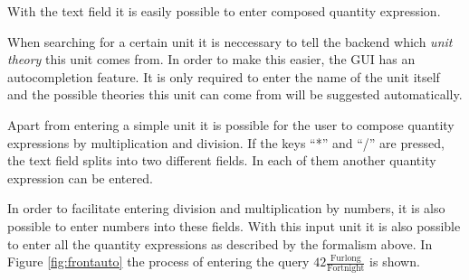 With the text field it is easily possible to enter composed quantity expression.

When searching for a certain unit it is neccessary to tell the backend which \textit{unit theory} this unit comes from. In order to make this easier, the GUI has an autocompletion feature. It is only required to enter the name of the unit itself and the possible theories this unit can come from will be suggested automatically.

Apart from entering a simple unit it is possible for the user to compose quantity expressions by multiplication and division. If the keys ``*'' and ``/'' are pressed, the text field splits into two different fields. In each of them another quantity expression can be entered.

In order to facilitate entering division and multiplication by numbers, it is also possible to enter numbers into these fields. With this input unit it is also possible to enter all the quantity expressions as described by the formalism above. In Figure \ref{fig:frontauto} the process of entering the query $42 \frac{\text{Furlong}}{\text{Fortnight}}$ is shown.

